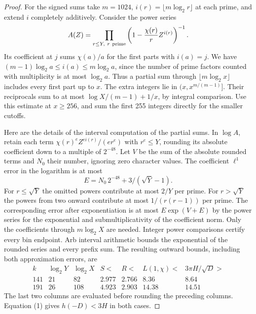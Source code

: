 \documentclass[11pt]{article}
\begin{document}
\begin{proof}
For the signed sums take \(m=1024\), \(i(r)=\lfloor m\log_2 r\rfloor\)
at each prime, and extend \(i\) completely additively. Consider the
power series
\[
 A(Z)=\prod_{r\le Y,\ r\ {\rm prime}}
        \left(1-\frac{\chi(r)}r Z^{i(r)}\right)^{-1}.
\]
Its coefficient at \(j\) sums \(\chi(a)/a\) for the first parts
with \(i(a)=j\). We have
\((m-1)\log_2 a\le i(a)\le m\log_2 a\), since the number of prime
factors counted with multiplicity is at most \(\log_2 a\).
Thus a partial sum through \(\lfloor m\log_2 x\rfloor\) includes
every first part up to \(x\). The extra integers lie in
\((x,x^{m/(m-1)}]\). Their reciprocals sum to at most
\(\log X/(m-1)+1/x\), by integral comparison. Use this estimate
at \(x\ge256\), and sum the first 255 integers directly for the
smaller cutoffs.

Here are the details of the interval computation of the partial
sums. In \(\log A\), retain each term
\(\chi(r)^e Z^{ei(r)}/(e r^e)\) with \(r^e\le Y\), rounding its
absolute coefficient down to a multiple of \(2^{-48}\). Let \(V\)
be the sum of the absolute rounded terms and \(N_0\) their number,
ignoring zero character values. The coefficient \(\ell^1\) error in
the logarithm is at most
\[
              E=N_0\,2^{-48}+3/(\sqrt Y-1).
\]
For \(r\le\sqrt Y\) the omitted powers contribute at most \(2/Y\)
per prime. For \(r>\sqrt Y\) the powers from two onward contribute
at most \(1/(r(r-1))\) per prime. The corresponding error after
exponentiation is at most \(E\exp(V+E)\) by the power series for
the exponential and submultiplicativity of the coefficient norm.
Only the coefficients through \(m\log_2 X\) are needed. Integer
power comparisons certify every bin endpoint. Arb interval arithmetic
bounds the exponential of the rounded series and every prefix sum.
The resulting outward bounds, including both approximation errors, are
\[
\begin{array}{r|rr|rr|rr}
 k&\log_2Y&\log_2X&S<&R<&L(1,\chi)<&3\pi H/\sqrt D>\\\hline
 141&21&82&2.977&2.766&8.36&8.64\\
 191&26&108&4.923&2.903&14.38&14.51
\end{array}
\]
The last two columns are evaluated before rounding the preceding
columns. Equation (1) gives \(h(-D)<3H\) in both cases.


\end{proof}
\end{document}
